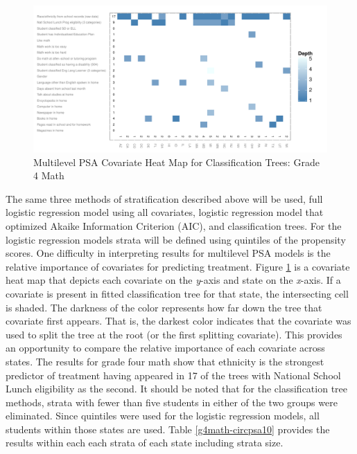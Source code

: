 \documentclass[letterpaper,12p,twoside]{article} %
\begin{document}
\begin{figure}[t]
\begin{center}
\includegraphics[width=\textwidth]{../Figures2009/g4math-mlpsa-ctree-heat.pdf}
\caption{Multilevel PSA Covariate Heat Map for Classification Trees: Grade 4 Math}
\label{fig:g4math-mlpsa-ctree-heat}
\end{center}
\end{figure}


The same three methods of stratification described above will be used, full logistic regression model using all covariates, logistic regression model that optimized Akaike Information Criterion (AIC), and classification trees. For the logistic regression models strata will be defined using quintiles of the propensity scores. One difficulty in interpreting results for multilevel PSA models is the relative importance of covariates for predicting treatment. Figure \ref{fig:g4math-mlpsa-ctree-heat} is a covariate heat map that depicts each covariate on the \textit{y}-axis and state on the \textit{x}-axis. If a covariate is present in fitted classification tree for that state, the intersecting cell is shaded. The darkness of the color represents how far down the tree that covariate first appears. That is, the darkest color indicates that the covariate was used to split the tree at the root (or the first splitting covariate). This provides an opportunity to compare the relative importance of each covariate across states. The results for grade four math show that ethnicity is the strongest predictor of treatment having appeared in 17 of the trees with National School Lunch eligibility as the second. It should be noted that for the classification tree methods, strata with fewer than five students in either of the two groups were eliminated. Since quintiles were used for the logistic regression models, all students within those states are used. Table \ref{g4math-circpsa10} provides the results within each each strata of each state including strata size.
\end{document}
